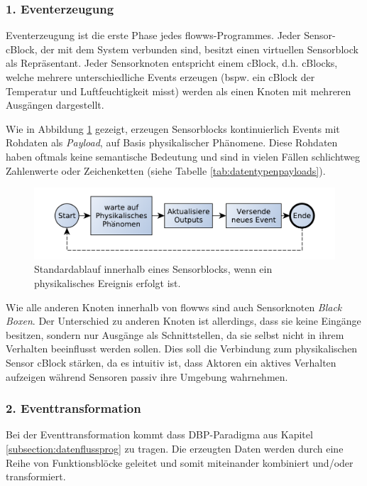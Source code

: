 \subsubsection{1. Eventerzeugung}
 Eventerzeugung ist die erste Phase jedes flowws-Programmes. Jeder Sensor-cBlock, der mit dem System verbunden sind, besitzt einen virtuellen Sensorblock als Repräsentant. Jeder Sensorknoten entspricht einem cBlock, d.h. cBlocks, welche mehrere unterschiedliche Events erzeugen (bspw. ein cBlock der Temperatur und Luftfeuchtigkeit misst) werden als einen Knoten mit mehreren Ausgängen dargestellt. 
 
 Wie in Abbildung \ref{fig:seqsensorblock} gezeigt, erzeugen Sensorblocks kontinuierlich Events mit Rohdaten als \textit{Payload}, auf Basis physikalischer Phänomene. Diese Rohdaten haben oftmals keine semantische Bedeutung und sind in vielen Fällen schlichtweg Zahlenwerte oder Zeichenketten (siehe Tabelle \ref{tab:datentypenpayloads}).
 
 \begin{figure}[h]
  \centering
  \includegraphics[width=1\textwidth]{bilder/chapter4/chapter4_2/sensorblockablauf.pdf}
  \caption{Standardablauf innerhalb eines Sensorblocks, wenn ein physikalisches Ereignis erfolgt ist.}
  \label{fig:seqsensorblock}
\end{figure}

 Wie alle anderen Knoten innerhalb von flowws sind auch Sensorknoten \textit{Black Boxen}. Der Unterschied zu anderen Knoten ist allerdings, dass sie keine Eingänge besitzen, sondern nur Ausgänge als Schnittstellen, da sie selbst nicht in ihrem Verhalten beeinflusst werden sollen. Dies soll die Verbindung zum physikalischen Sensor cBlock stärken, da es intuitiv ist, dass Aktoren ein aktives Verhalten aufzeigen während Sensoren passiv ihre Umgebung wahrnehmen. 
 
 \subsubsection{2. Eventtransformation}\label{subsubsec:eventtrans}
 Bei der Eventtransformation kommt dass \ac{DBP}-Paradigma aus Kapitel \ref{subsection:datenflussprog} zu tragen. Die erzeugten Daten werden durch eine Reihe von Funktionsblöcke geleitet und somit miteinander kombiniert und/oder transformiert. 
 
